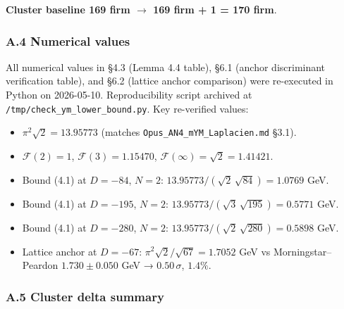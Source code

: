 \documentclass[
  11pt,
  a4paper,
]{amsart}
\providecommand{\tightlist}{\setlength{\itemsep}{0pt}\setlength{\parskip}{0pt}}
\providecommand{\tightlist}{%
  \setlength{\itemsep}{0pt}\setlength{\parskip}{0pt}}
\begin{document}
\textbf{Cluster baseline 169 firm \(\to\) 169 firm + 1 = 170 firm}.

\hypertarget{a.4-numerical-values}{%
\subsubsection{A.4 Numerical values}\label{a.4-numerical-values}}

All numerical values in §4.3 (Lemma 4.4 table), §6.1 (anchor discriminant verification table), and §6.2 (lattice anchor comparison) were re-executed in Python on 2026-05-10. Reproducibility script archived at \texttt{/tmp/check\_ym\_lower\_bound.py}. Key re-verified values:

\begin{itemize}
\tightlist
\item
  \(\pi^2 \sqrt{2} = 13.95773\) (matches \texttt{Opus\_AN4\_mYM\_Laplacien.md} §3.1).
\item
  \(\mathcal{F}(2) = 1\), \(\mathcal{F}(3) = 1.15470\), \(\mathcal{F}(\infty) = \sqrt{2} = 1.41421\).
\item
  Bound (4.1) at \(D = -84\), \(N = 2\): \(13.95773 / (\sqrt{2}\,\sqrt{84}) = 1.0769\) GeV.
\item
  Bound (4.1) at \(D = -195\), \(N = 2\): \(13.95773 / (\sqrt{3}\,\sqrt{195}) = 0.5771\) GeV.
\item
  Bound (4.1) at \(D = -280\), \(N = 2\): \(13.95773 / (\sqrt{2}\,\sqrt{280}) = 0.5898\) GeV.
\item
  Lattice anchor at \(D = -67\): \(\pi^2\sqrt{2}/\sqrt{67} = 1.7052\) GeV vs Morningstar--Peardon \(1.730 \pm 0.050\) GeV → \(0.50\,\sigma\), \(1.4 \%\).
\end{itemize}

\hypertarget{a.5-cluster-delta-summary}{%
\subsubsection{A.5 Cluster delta summary}\label{a.5-cluster-delta-summary}}
\end{document}
